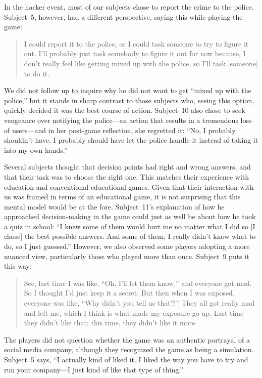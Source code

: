 \documentclass[letterpaper]{article}
\begin{document}
In the hacker event, most of our subjects chose to report the
crime to the police. Subject~5, however, had a different
perspective, saying this while playing the game: 
\begin{quote}
I could report it to the police, or I could task someone to try to
figure it out. I'll probably just task somebody to figure it out for now
because, I don't really feel like getting mixed up with the police,
so I'll task [someone] to do it.
\end{quote}
We did not follow up to inquire why he did not want to get ``mixed up
with the police,'' but it stands in sharp contrast to those subjects
who, seeing this option, quickly decided it was the best course of
action.  Subject~10 also chose to seek vengeance over
notifying the police---an action that results in a tremendous loss of
users---and in her post-game reflection, she regretted it:
``No, I probably shouldn't have. I probably should have let
the police handle it instead of taking it into my own hands.''

Several subjects thought that decision points had right and wrong
answers, and that their task was to choose the right one.
This matches their experience with education and conventional
educational games. Given that their interaction with us was framed in terms
of an educational game, it is not surprising that this mental model
would be at the fore.
Subject~11's explanation of how he approached decision-making in the
game could just as well be about how he took a quiz in school:
``I knew some of them would hurt me no matter what I did so [I chose] the
best possible answers. And some of them, I really didn't know what to do,
so I just guessed.''
However, we also observed some players adopting a more nuanced view,
particularly those who played more than once. Subject~9 puts it this way:
\begin{quote}
See, last time I was like, ``Oh, I'll let them know,'' and everyone
got mad. So I thought I'd just keep it a secret.
But then when I was exposed, everyone was like,
 ``Why didn't you tell us that?!''
They all got really mad and left me, which I think is what made my exposure
go up. Last time they didn't like that; this time, they didn't like it more.
\end{quote}

The players did not question whether the game was an authentic
portrayal of a social media company, although they recognized
the game as being a simulation.
Subject~5 says, ``I actually kind of liked it. I liked the way you have to try and run your company---I just kind of like that type of thing.''
\end{document}
